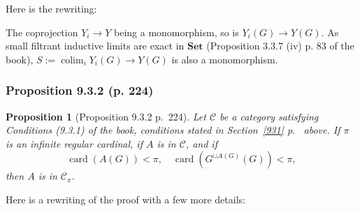\documentclass[12pt]{article}%
\newtheorem{prop}[thm]{Proposition}
\theoremstyle{remark}
\theoremstyle{definition}
\newcommand{\C}{\mathcal C}
\newcommand{\Set}{\mathbf{Set}}%
\DeclareMathOperator*{\colim}{colim}%
\DeclareMathOperator{\card}{card}%
\begin{document}
Here is the rewriting: 

The coprojection $Y_i\to Y$ being a monomorphism, so is $Y_i(G)\to Y(G)$. As small filtrant inductive limits are exact in $\Set$ (Proposition 3.3.7 (iv) p. 83 of the book), $S:=\colim_iY_i(G)\to Y(G)$ is also a monomorphism.

%

\subsubsection{Proposition 9.3.2 (p. 224)}

\begin{prop}[Proposition 9.3.2 p.~224]\label{932}
Let $\C$ be a category satisfying Conditions (9.3.1) of the book, conditions stated in Section~\ref{931} p.~\pageref{931} above. If $\pi$ is an infinite regular cardinal, if $A$ is in $\C$, and if 
$$
\card(A(G))<\pi,\quad\card(G^{\sqcup A(G)}(G))<\pi,
$$ 
then $A$ is in $\C_\pi$.
\end{prop}

Here is a rewriting of the proof with a few more details:
\end{document}
